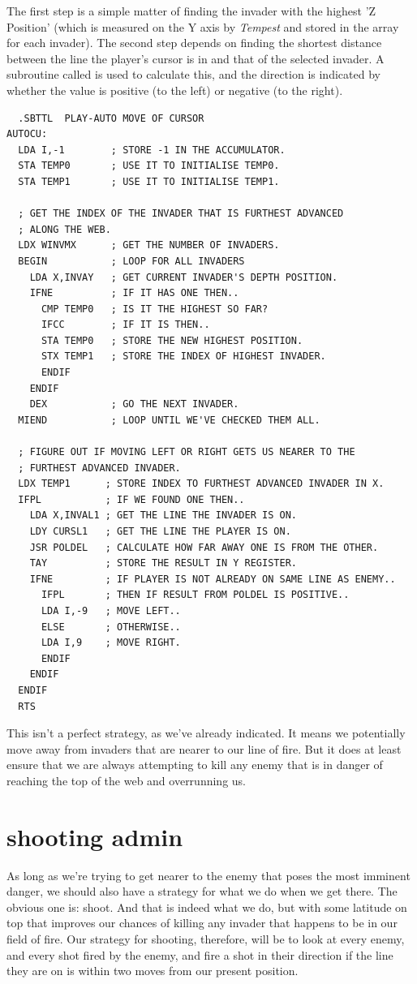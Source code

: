 The first step is a simple matter of finding the invader with the highest 'Z Position' (which
is measured on the Y axis by \textit{Tempest} and stored in the  array for each
invader).
The second step depends on finding the shortest distance between the line the player's cursor is in and that
of the selected invader. A subroutine called  is used to calculate this, and
the direction is indicated by whether the value is positive (to the left) or negative (to the right).
\begin{lstlisting}
  .SBTTL  PLAY-AUTO MOVE OF CURSOR
AUTOCU: 
  LDA I,-1        ; STORE -1 IN THE ACCUMULATOR.
  STA TEMP0       ; USE IT TO INITIALISE TEMP0.
  STA TEMP1       ; USE IT TO INITIALISE TEMP1.

  ; GET THE INDEX OF THE INVADER THAT IS FURTHEST ADVANCED
  ; ALONG THE WEB.
  LDX WINVMX      ; GET THE NUMBER OF INVADERS.
  BEGIN           ; LOOP FOR ALL INVADERS
    LDA X,INVAY   ; GET CURRENT INVADER'S DEPTH POSITION. 
    IFNE          ; IF IT HAS ONE THEN..
      CMP TEMP0   ; IS IT THE HIGHEST SO FAR?
      IFCC        ; IF IT IS THEN..
      STA TEMP0   ; STORE THE NEW HIGHEST POSITION.
      STX TEMP1   ; STORE THE INDEX OF HIGHEST INVADER.
      ENDIF
    ENDIF
    DEX           ; GO THE NEXT INVADER.
  MIEND           ; LOOP UNTIL WE'VE CHECKED THEM ALL.

  ; FIGURE OUT IF MOVING LEFT OR RIGHT GETS US NEARER TO THE
  ; FURTHEST ADVANCED INVADER.
  LDX TEMP1      ; STORE INDEX TO FURTHEST ADVANCED INVADER IN X.
  IFPL           ; IF WE FOUND ONE THEN..
    LDA X,INVAL1 ; GET THE LINE THE INVADER IS ON.
    LDY CURSL1   ; GET THE LINE THE PLAYER IS ON.
    JSR POLDEL   ; CALCULATE HOW FAR AWAY ONE IS FROM THE OTHER. 
    TAY          ; STORE THE RESULT IN Y REGISTER.
    IFNE         ; IF PLAYER IS NOT ALREADY ON SAME LINE AS ENEMY..
      IFPL       ; THEN IF RESULT FROM POLDEL IS POSITIVE..
      LDA I,-9   ; MOVE LEFT..
      ELSE       ; OTHERWISE..
      LDA I,9    ; MOVE RIGHT.
      ENDIF
    ENDIF
  ENDIF
  RTS
\end{lstlisting}

This isn't a perfect strategy, as we've already indicated. It means we potentially
move away from invaders that are nearer to our line of fire. But it does at least
ensure that we are always attempting to kill any enemy that is in danger of reaching
the top of the web and overrunning us.
\clearpage
\section*{shooting admin}
As long as we're trying to get nearer to the enemy that poses the most imminent danger,
we should also have a strategy for what we do when we get there. The obvious one is: shoot.
And that is indeed what we do, but with some latitude on top that improves our chances of 
killing any invader that happens to be in our field of fire. Our strategy for shooting,
therefore, will be to look at every enemy, and every shot fired by the enemy, and fire 
a shot in their direction if the line they are on is within two moves from our present position.

